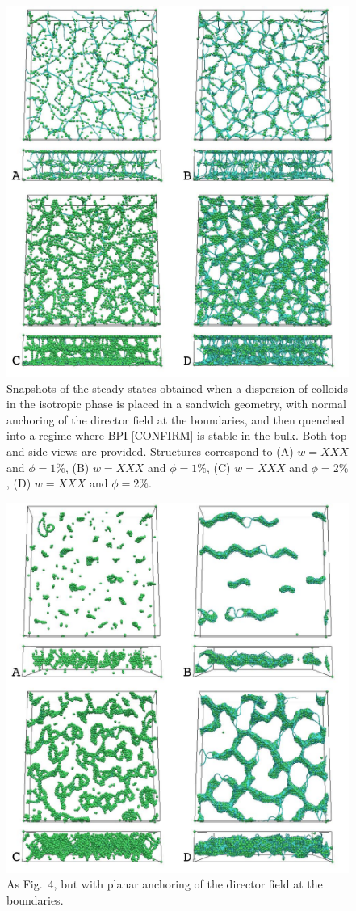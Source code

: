 \documentclass[12pt]{article}
\begin{document}
\begin{figure}
\includegraphics[width=\textwidth]{s3.jpg}
\caption{Snapshots of the steady states obtained when a dispersion of colloids in the isotropic phase is placed in a sandwich geometry, with normal anchoring of the director field
at the boundaries, and then quenched into a regime where BPI [CONFIRM] is stable in the bulk. Both top and side views are provided. 
Structures correspond
to (A) $w=XXX$ and $\phi=1\%$, (B) $w=XXX$ and $\phi=1\%$,
(C) $w=XXX$ and $\phi=2\%$, (D) $w=XXX$ and $\phi=2\%$.
}
\end{figure}

\begin{figure}
\includegraphics[width=\textwidth]{s4.jpg}
\caption{As Fig.~4, but with planar anchoring of the director 
field at the boundaries.}
\end{figure}
\end{document}
